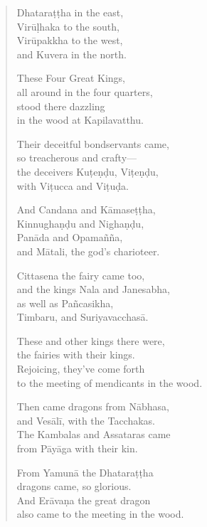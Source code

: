 \documentclass[12pt,openany]{book}%
\begin{document}
\begin{verse}
\textsanskrit{Dhataraṭṭha} in the east, \\
\textsanskrit{Virūḷhaka} to the south, \\
\textsanskrit{Virūpakkha} to the west, \\
and Kuvera in the north. 

These Four Great Kings, \\
all around in the four quarters, \\
stood there dazzling \\
in the wood at Kapilavatthu. 

Their deceitful bondservants came, \\
so treacherous and crafty—\\
the deceivers \textsanskrit{Kuṭeṇḍu}, \textsanskrit{Viṭeṇḍu}, \\
with \textsanskrit{Viṭucca} and \textsanskrit{Viṭuḍa}. 

And Candana and \textsanskrit{Kāmaseṭṭha}, \\
\textsanskrit{Kinnughaṇḍu} and \textsanskrit{Nighaṇḍu}, \\
\textsanskrit{Panāda} and \textsanskrit{Opamañña}, \\
and \textsanskrit{Mātali}, the god’s charioteer. 

Cittasena the fairy came too, \\
and the kings Nala and Janesabha, \\
as well as \textsanskrit{Pañcasikha}, \\
Timbaru, and \textsanskrit{Suriyavacchasā}. 

These and other kings there were, \\
the fairies with their kings. \\
Rejoicing, they’ve come forth \\
to the meeting of mendicants in the wood. 

Then came dragons from \textsanskrit{Nābhasa}, \\
and \textsanskrit{Vesālī}, with the Tacchakas. \\
The Kambalas and Assataras came \\
from \textsanskrit{Pāyāga} with their kin. 

From \textsanskrit{Yamunā} the \textsanskrit{Dhataraṭṭha} \\
dragons came, so glorious. \\
And \textsanskrit{Erāvaṇa} the great dragon \\
also came to the meeting in the wood. 


\end{verse}
\end{document}

